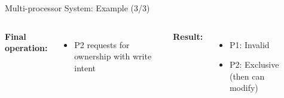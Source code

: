 \documentclass[aspectratio=169,12pt]{beamer}
\begin{document}
\begin{frame}{Multi-processor System: Example (3/3)}
\begin{columns}
\textbf{Final operation:}
\begin{itemize}
\item P2 requests for ownership with write intent
\end{itemize}

\vspace{1em}
\textbf{Result:}
\begin{itemize}
\item P1: Invalid
\item P2: Exclusive (then can modify)
\end{itemize}

\begin{center}
\end{center}
\end{columns}
\end{frame}
\end{document}
